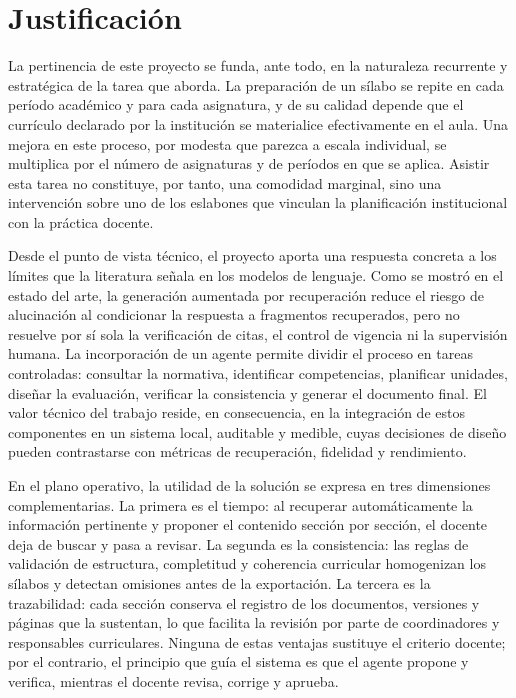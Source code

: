 \section{Justificación}
La pertinencia de este proyecto se funda, ante todo, en la naturaleza recurrente y estratégica de la tarea que aborda. La preparación de un sílabo se repite en cada período académico y para cada asignatura, y de su calidad depende que el currículo declarado por la institución se materialice efectivamente en el aula. Una mejora en este proceso, por modesta que parezca a escala individual, se multiplica por el número de asignaturas y de períodos en que se aplica. Asistir esta tarea no constituye, por tanto, una comodidad marginal, sino una intervención sobre uno de los eslabones que vinculan la planificación institucional con la práctica docente.

Desde el punto de vista técnico, el proyecto aporta una respuesta concreta a los límites que la literatura señala en los modelos de lenguaje. Como se mostró en el estado del arte, la generación aumentada por recuperación reduce el riesgo de alucinación al condicionar la respuesta a fragmentos recuperados, pero no resuelve por sí sola la verificación de citas, el control de vigencia ni la supervisión humana. La incorporación de un agente permite dividir el proceso en tareas controladas: consultar la normativa, identificar competencias, planificar unidades, diseñar la evaluación, verificar la consistencia y generar el documento final. El valor técnico del trabajo reside, en consecuencia, en la integración de estos componentes en un sistema local, auditable y medible, cuyas decisiones de diseño pueden contrastarse con métricas de recuperación, fidelidad y rendimiento.

En el plano operativo, la utilidad de la solución se expresa en tres dimensiones complementarias. La primera es el tiempo: al recuperar automáticamente la información pertinente y proponer el contenido sección por sección, el docente deja de buscar y pasa a revisar. La segunda es la consistencia: las reglas de validación de estructura, completitud y coherencia curricular homogenizan los sílabos y detectan omisiones antes de la exportación. La tercera es la trazabilidad: cada sección conserva el registro de los documentos, versiones y páginas que la sustentan, lo que facilita la revisión por parte de coordinadores y responsables curriculares. Ninguna de estas ventajas sustituye el criterio docente; por el contrario, el principio que guía el sistema es que el agente propone y verifica, mientras el docente revisa, corrige y aprueba.

